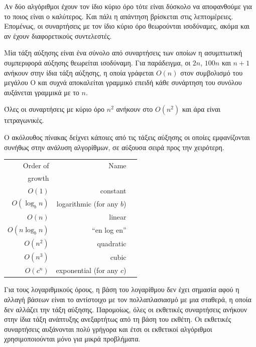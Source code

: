 \documentclass[10pt]{book}
\begin{document}
Αν δύο αλγόριθμοι έχουν τον ίδιο κύριο όρο τότε είναι δύσκολο να αποφανθούμε για το 
ποιος είναι ο καλύτερος. Και πάλι η απάντηση βρίσκεται στις λεπτομέρειες. Επομένως, 
οι συναρτήσεις με τον ίδιο κύριο όρο θεωρούνται ισοδύναμες, ακόμα και αν έχουν διαφορετικούς συντελεστές.


Μία τάξη αύξησης είναι ένα σύνολο από συναρτήσεις των οποίων η ασυμπτωτική συμπεριφορά αύξησης θεωρείται ισοδύναμη.  Για παράδειγμα, οι $2n$, $100n$ και 
$n+1$ ανήκουν στην ίδια τάξη αύξησης, η οποία γράφεται $O(n)$ στον συμβολισμό του μεγάλου Ο και συχνά αποκαλείται γραμμικό επειδή κάθε συνάρτηση του συνόλου αυξάνεται 
γραμμικά με το $n$.

Όλες οι συναρτήσεις με κύριο όρο $n^2$ ανήκουν στο $O(n^2)$ και άρα είναι τετραγωνικές.

Ο ακόλουθος πίνακας δείχνει κάποιες από τις τάξεις αύξησης οι οποίες εμφανίζονται 
συνήθως στην ανάλυση αλγορίθμων, σε αύξουσα σειρά προς την χειρότερη. 

\begin{tabular}{|r|r|r|}
\hline
Order of     &   Name      \\
growth       &               \\
\hline
$O(1)$             & constant \\
$O(\log_b n)$      & logarithmic (for any $b$) \\
$O(n)$             & linear \\
$O(n \log_b n)$    & ``en log en'' \\
$O(n^2)$           & quadratic     \\
$O(n^3)$           & cubic     \\
$O(c^n)$           & exponential (for any $c$)    \\
\hline
\end{tabular}

 Για τους λογαριθμικούς όρους, η βάση του λογαρίθμου δεν έχει σημασία αφού η 
αλλαγή βάσεων είναι το αντίστοιχο με τον πολλαπλασιασμό με μια σταθερά, η οποία 
δεν αλλάζει την τάξη αύξησης.  Παρομοίως, όλες οι εκθετικές συναρτήσεις ανήκουν 
στην ίδια τάξη ανάπτυξης ανεξαρτήτως από τη βάση του εκθέτη.  
Οι εκθετικές συναρτήσεις αυξάνονται πολύ γρήγορα και έτσι οι εκθετικοί αλγόριθμοι χρησιμοποιούνται μόνο για μικρά προβλήματα.
\end{document}
